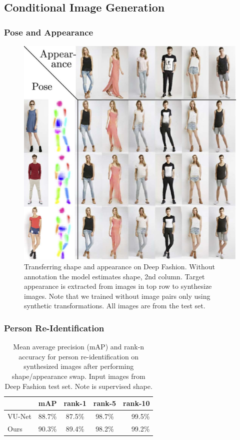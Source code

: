 	\subsection{Conditional Image Generation}
		\begin{frame}[t]
		\frametitle{Pose and Appearance}
			\begin{figure}[htp]
				\centering
				\includegraphics[trim={0cm 0cm 0cm 0cm},clip, width=.5\linewidth]{fig/factor/swappy}
				\caption{Transferring shape and appearance on Deep Fashion. Without annotation the model estimates shape, 2nd column. Target appearance is extracted from images in top row to synthesize images. Note that we trained without image pairs only using synthetic transformations.
				All images are from the test set.}
				\label{fig:allswaps}
			\end{figure}
		\end{frame}

		\begin{frame}[t]
		\frametitle{Person Re-Identification}
			\begin{table}[htp]
				\centering
				\caption{Mean average precision (mAP) and rank-n accuracy for person re-identification on synthesized images after performing shape/appearance swap. Input images from Deep Fashion test set. Note \cite{esser18} is supervised \wrt shape.}
				\label{tab:reid}
				\begin{tabular}{l|cccr}
					\hline
					& mAP & rank-1 & rank-5 & rank-10 \\ \hline
					VU-Net \cite{esser18} & 88.7\% & 87.5\% & {98.7}\% & {99.5}\% \\
					Ours & {90.3}\% & {89.4}\% &{98.2}\% & {99.2}\% \\ \hline
				\end{tabular}
			\end{table}
		\end{frame}

